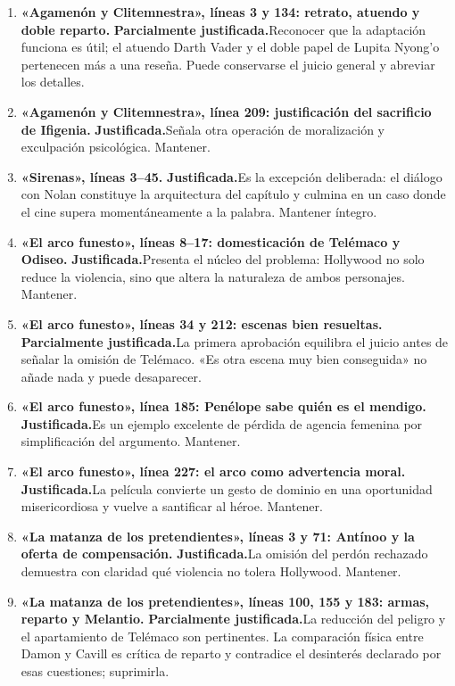 \documentclass[11pt,a4paper]{article}
\newcommand{\justificada}{\textbf{Justificada.}}
\newcommand{\parcial}{\textbf{Parcialmente justificada.}}
\begin{document}
\begin{enumerate}
\item \textbf{«Agamenón y Clitemnestra», líneas 3 y 134: retrato, atuendo y doble reparto.} \parcial Reconocer que la adaptación funciona es útil; el atuendo Darth Vader y el doble papel de Lupita Nyong'o pertenecen más a una reseña. Puede conservarse el juicio general y abreviar los detalles.

\item \textbf{«Agamenón y Clitemnestra», línea 209: justificación del sacrificio de Ifigenia.} \justificada Señala otra operación de moralización y exculpación psicológica. Mantener.

\item \textbf{«Sirenas», líneas 3--45.} \justificada Es la excepción deliberada: el diálogo con Nolan constituye la arquitectura del capítulo y culmina en un caso donde el cine supera momentáneamente a la palabra. Mantener íntegro.

\item \textbf{«El arco funesto», líneas 8--17: domesticación de Telémaco y Odiseo.} \justificada Presenta el núcleo del problema: Hollywood no solo reduce la violencia, sino que altera la naturaleza de ambos personajes. Mantener.

\item \textbf{«El arco funesto», líneas 34 y 212: escenas bien resueltas.} \parcial La primera aprobación equilibra el juicio antes de señalar la omisión de Telémaco. «Es otra escena muy bien conseguida» no añade nada y puede desaparecer.

\item \textbf{«El arco funesto», línea 185: Penélope sabe quién es el mendigo.} \justificada Es un ejemplo excelente de pérdida de agencia femenina por simplificación del argumento. Mantener.

\item \textbf{«El arco funesto», línea 227: el arco como advertencia moral.} \justificada La película convierte un gesto de dominio en una oportunidad misericordiosa y vuelve a santificar al héroe. Mantener.

\item \textbf{«La matanza de los pretendientes», líneas 3 y 71: Antínoo y la oferta de compensación.} \justificada La omisión del perdón rechazado demuestra con claridad qué violencia no tolera Hollywood. Mantener.

\item \textbf{«La matanza de los pretendientes», líneas 100, 155 y 183: armas, reparto y Melantio.} \parcial La reducción del peligro y el apartamiento de Telémaco son pertinentes. La comparación física entre Damon y Cavill es crítica de reparto y contradice el desinterés declarado por esas cuestiones; suprimirla.


\end{enumerate}
\end{document}
